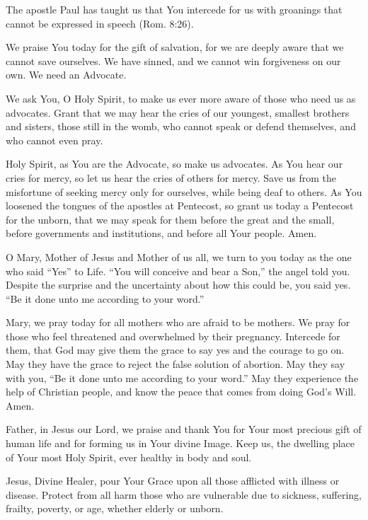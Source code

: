 The apostle Paul has taught us that You intercede for us with groanings that cannot be expressed in speech (Rom. 8:26).

We praise You today for the gift of salvation, for we are deeply aware that we cannot save ourselves.
We have sinned, and we cannot win forgiveness on our own.
We need an Advocate.

We ask You, O Holy Spirit, to make us ever more aware of those who need us as advocates.
Grant that we may hear the cries of our youngest, smallest brothers and sisters, those still in the womb, who cannot speak or defend themselves, and who cannot even pray.

Holy Spirit, as You are the Advocate, so make us advocates.
As You hear our cries for mercy, so let us hear the cries of others for mercy.
Save us from the misfortune of seeking mercy only for ourselves, while being deaf to others.
As You loosened the tongues of the apostles at Pentecost, so grant us today a Pentecost for the unborn, that we may speak for them before the great and the small, before governments and institutions, and before all Your people.
Amen.

O Mary, Mother of Jesus and Mother of us all, we turn to you today as the one who said ``Yes'' to Life.
``You will conceive and bear a Son,'' the angel told you.
Despite the surprise and the uncertainty about how this could be, you said yes.
``Be it done unto me according to your word.''

Mary, we pray today for all mothers who are afraid to be mothers.
We pray for those who feel threatened and overwhelmed by their pregnancy.
Intercede for them, that God may give them the grace to say yes and the courage to go on.
May they have the grace to reject the false solution of abortion.
May they say with you, ``Be it done unto me according to your word.''
May they experience the help of Christian people, and know the peace that comes from doing God's Will.
Amen.

Father, in Jesus our Lord, we praise and thank You for Your most precious gift of human life and for forming us in Your divine Image.
Keep us, the dwelling place of Your most Holy Spirit, ever healthy in body and soul.

Jesus, Divine Healer, pour Your Grace upon all those afflicted with illness or disease.
Protect from all harm those who are vulnerable due to sickness, suffering, frailty, poverty, or age, whether elderly or unborn.

